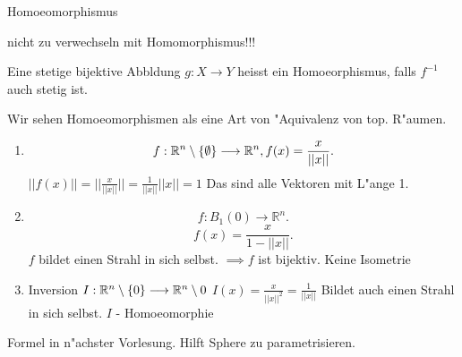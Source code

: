 \documentclass[class=article, crop=false]{standalone}
\begin{document}
\begin{zettel}{Homoeomorphismus}
\begin{flashcard}
    nicht zu verwechseln mit Homomorphismus!!!
\begin{definition}[Homoeomorphismus]
   Eine stetige bijektive Abbldung $g:X \longrightarrow Y$  heisst ein Homoeorphismus, falls $f^{-1} $  auch stetig ist.
   \begin{remark}
      Wir sehen Homoeomorphismen als eine Art von "Aquivalenz von top. R"aumen. 
   \end{remark}
\end{definition}

\begin{example}
    \begin{enumerate}
    \item \[
        f: \mathbb{R}^n \setminus \set{\emptyset} \longrightarrow  \mathbb{R}^n , f(x) =  \frac{x}{ ||x||}
    .\]
    $ ||f(x)|| = ||\frac{x}{||x||}|| = \frac{1}{ ||x||} ||x|| = 1 $ 
    Das sind alle Vektoren mit L"ange 1.
     \item \[
         f: B_1 (0) \longrightarrow \mathbb{R}^n
     .\]
     \[
         f(x) =  \frac{x}{1 - ||x||} 
     .\]
     $f$ bildet einen Strahl in sich selbst. $\implies f$ ist bijektiv. Keine Isometrie

     \item Inversion $I: \mathbb{R}^n \setminus \set{0} \longrightarrow  \R^n \setminus 0$  \quad $I(x) = \frac{x}{ ||x||^2 } = \frac{1}{ ||x||}  $ Bildet auch einen Strahl in sich selbst. $I$ - Homoeomorphie
    \end{enumerate}
\end{example}

\begin{example}
    Formel in n"achster Vorlesung. Hilft Sphere zu parametrisieren.
\end{example}

\end{flashcard}
\end{zettel}
\end{document}
